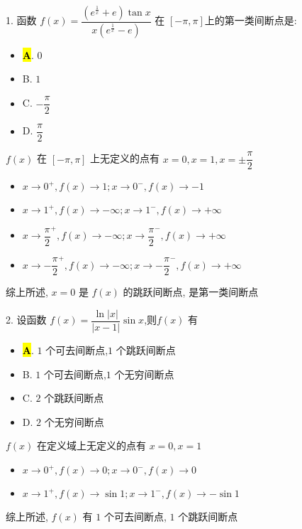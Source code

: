 1. 函数 $f(x)=\dfrac{(e^{\frac{1}{x}}+e)\tan x}{x(e^{\frac{1}{x}}-e)}$ 在 $[-\pi,\pi]$上的第一类间断点是:
\begin{itemize}
	\item \hl{\textbf{A}}. $0$
	\item B. $1$
	\item C. $-\dfrac{\pi}{2}$
	\item D. $\dfrac{\pi}{2}$
\end{itemize}
\begin{solution}

	$f(x)$ 在 $[-\pi,\pi]$ 上无定义的点有 $x=0, x=1, x=\pm\dfrac{\pi}{2}$

	\begin{itemize}
		\item $x\to 0^{+}, f(x)\to 1 ; x\to 0^{-}, f(x)\to -1$
		\item $x\to 1^{+}, f(x)\to -\infty ; x\to 1^{-}, f(x)\to +\infty$
		\item $x\to \dfrac{\pi}{2}^{+}, f(x)\to -\infty ; x\to \dfrac{\pi}{2}^{-}, f(x)\to +\infty$
		\item $x\to -\dfrac{\pi}{2}^{+}, f(x)\to -\infty ; x\to -\dfrac{\pi}{2}^{-}, f(x)\to +\infty$
	\end{itemize}

	综上所述, $x=0$ 是 $f(x)$ 的跳跃间断点, 是第一类间断点
\end{solution}

2. 设函数 $f(x)=\dfrac{\ln|x|}{|x-1|}\sin x$,则$f(x)$ 有
\begin{itemize}
	\item \hl{\textbf{A}}. $1$ 个可去间断点,$1$ 个跳跃间断点
	\item B. $1$ 个可去间断点,$1$ 个无穷间断点
	\item C. $2$ 个跳跃间断点
	\item D. $2$ 个无穷间断点
\end{itemize}
\begin{solution}

	$f(x)$ 在定义域上无定义的点有 $x=0, x=1$
	\begin{itemize}
		\item $x\to 0^{+}, f(x)\to 0 ; x\to 0^{-}, f(x)\to 0$
		\item $x\to 1^{+}, f(x)\to \sin 1 ; x\to 1^{-}, f(x)\to -\sin 1$
	\end{itemize}

	综上所述, $f(x)$ 有 $1$ 个可去间断点, $1$ 个跳跃间断点
\end{solution}

